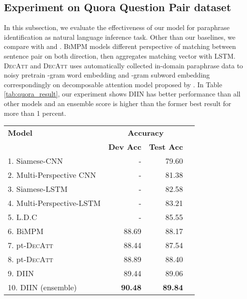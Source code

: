 \documentclass{article} \usepackage{iclr2018_conference,times}
\begin{document}
\subsection{Experiment on Quora Question Pair dataset}
In this subsection, we evaluate the effectiveness of our model for paraphrase identification as natural language inference task. Other than our baselines, we compare with \citet{BIMPM_Wang:2017td} and \citet{noisy_pretraining_Tomar:2017wa}. \textsc{BiMPM} models different perspective of matching between sentence pair on both direction, then aggregates matching vector with LSTM.  \textsc{DecAtt} and \textsc{DecAtt} uses automatically collected in-domain paraphrase data to noisy pretrain -gram word embedding and -gram subword embedding correspondingly on decomposable attention model proposed by \citep{decomposable_Parikh:2016tz}. In Table \ref{tab:quora_result}, our experiment shows DIIN has better performance than all other models and an ensemble score is higher than the former best result for more than 1 percent.


\begin{table*}
\centering
\small
\begin{tabular}{l r r r}
\toprule
{\bf Model} & 
\multicolumn{2}{c}{\bf Accuracy} \\

{}    & {\bf Dev Acc} & {\bf Test Acc} \\
\midrule
1. Siamese-CNN & - & 79.60 \\
2. Multi-Perspective CNN & - & 81.38 \\ 
3. Siamese-LSTM & - & 82.58 \\ 
4. Multi-Perspective-LSTM & - & 83.21 \\
5. L.D.C & - & 85.55 \\
6. BiMPM\citep{BIMPM_Wang:2017td} & 88.69 & 88.17 \\
\midrule
7. pt-\textsc{DecAtt}\citep{noisy_pretraining_Tomar:2017wa} & 88.44 & 87.54 \\
8. pt-\textsc{DecAtt}\citep{noisy_pretraining_Tomar:2017wa} & 88.89 & 88.40 \\
\midrule
9. DIIN & 89.44 & 89.06 \\
10. DIIN (ensemble) & \textbf{90.48} & \textbf{89.84} \\

\bottomrule
\end{tabular}

\caption{Quora question dataset result. First six rows are copied from \cite{BIMPM_Wang:2017td} and next two rows from \citep{noisy_pretraining_Tomar:2017wa}. \label{tab:quora_result}}
\end{table*}
\end{document}
